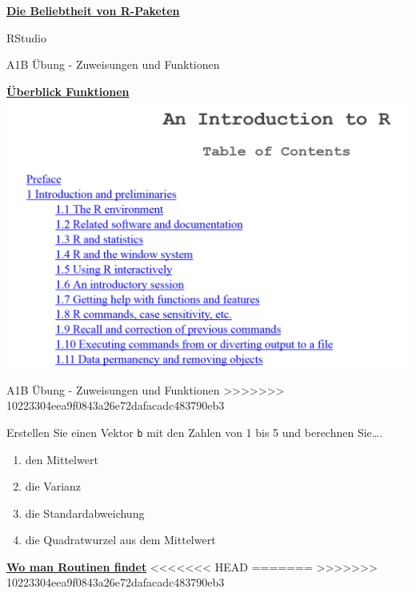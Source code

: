 \documentclass[ignorenonframetext,]{beamer}
\begin{document}
\begin{frame}{\href{https://gallery.shinyapps.io/cran-gauge/}{\textbf{Die
Beliebtheit von R-Paketen}}}
\begin{frame}{RStudio}
\begin{frame}[fragile]{A1B Übung - Zuweisungen und Funktionen}
\begin{frame}{\href{http://cran.r-project.org/doc/manuals/R-intro.html}{\textbf{Überblick
Funktionen}}}
\includegraphics{figure/UebersichtBefehle.PNG}

\end{frame}

\begin{frame}[fragile]{A1B Übung - Zuweisungen und Funktionen}
\protect\hypertarget{a1b-ubung---zuweisungen-und-funktionen}{}
>>>>>>> 10223304eea9f0843a26e72dafacadc483790eb3

Erstellen Sie einen Vektor \texttt{b} mit den Zahlen von 1 bis 5 und
berechnen Sie\ldots{}.

\begin{enumerate}
<<<<<<< HEAD
\def\labelenumi{\arabic{enumi}.}
=======
>>>>>>> 10223304eea9f0843a26e72dafacadc483790eb3
\item
  den Mittelwert
\item
  die Varianz
\item
  die Standardabweichung
\item
  die Quadratwurzel aus dem Mittelwert
\end{enumerate}

\end{frame}

\begin{frame}{\href{https://stats.idre.ucla.edu/r/seminars/intro/}{\textbf{Wo
man Routinen findet}}}
<<<<<<< HEAD
=======
\protect\hypertarget{wo-man-routinen-findet}{}
>>>>>>> 10223304eea9f0843a26e72dafacadc483790eb3


\end{frame}
\end{frame}
\end{frame}
\end{frame}
\end{document}
